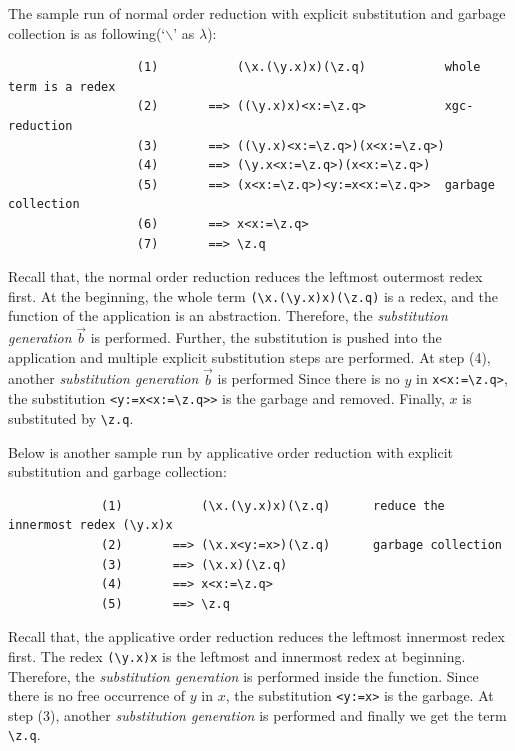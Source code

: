 \begin{exmp}
\normalfont The sample run of normal order reduction with explicit substitution and garbage collection is as following(`$\backslash$' as $\lambda$):
\end{exmp}
\begin{verbatim}
                  (1)           (\x.(\y.x)x)(\z.q)           whole term is a redex
                  (2)       ==> ((\y.x)x)<x:=\z.q>           xgc-reduction
                  (3)       ==> ((\y.x)<x:=\z.q>)(x<x:=\z.q>)
                  (4)       ==> (\y.x<x:=\z.q>)(x<x:=\z.q>)
                  (5)       ==> (x<x:=\z.q>)<y:=x<x:=\z.q>>  garbage collection
                  (6)       ==> x<x:=\z.q>
                  (7)       ==> \z.q          
\end{verbatim}

Recall that, the normal order reduction reduces the leftmost outermost redex first. At the beginning, the whole term \verb|(\x.(\y.x)x)(\z.q)| is a redex, and the function of the application is an abstraction. Therefore, the \textit{substitution generation} $\overrightarrow{b}$ is performed. Further, the substitution is pushed into the application and multiple explicit substitution steps are performed. At step (4), another \textit{substitution generation} $\overrightarrow{b}$ is performed Since there is no $y$ in \verb|x<x:=\z.q>|, the substitution \verb|<y:=x<x:=\z.q>>| is the garbage and removed. Finally, $x$ is substituted by \verb|\z.q|.

\begin{exmp}
\normalfont Below is another sample run by applicative order reduction with explicit substitution and garbage collection:
\end{exmp}
\begin{verbatim}
             (1)           (\x.(\y.x)x)(\z.q)      reduce the innermost redex (\y.x)x
             (2)       ==> (\x.x<y:=x>)(\z.q)      garbage collection
             (3)       ==> (\x.x)(\z.q)
             (4)       ==> x<x:=\z.q>
             (5)       ==> \z.q
\end{verbatim}

Recall that, the applicative order reduction reduces the leftmost innermost redex first. The redex \verb|(\y.x)x| is the leftmost and innermost redex at beginning. Therefore, the \textit{substitution generation} is performed inside the function. Since there is no free occurrence of $y$ in $x$, the substitution \verb|<y:=x>| is the garbage. At step (3), another \textit{substitution generation} is performed and finally we get the term \verb|\z.q|. 



